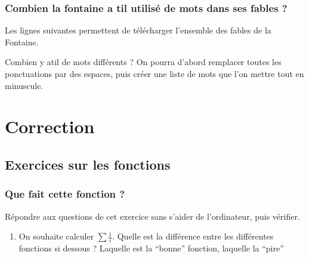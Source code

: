 \documentclass[letterpaper,10pt,english]{sphinxhowto}
\begin{document}
\subsubsection{Combien la fontaine a t\sphinxhyphen{}il utilisé de mots dans ses fables ?}
\label{\detokenize{cours4_chaine_caractere_exercices:combien-la-fontaine-a-t-il-utilise-de-mots-dans-ses-fables}}
\sphinxAtStartPar
Les lignes suivantes permettent de télécharger l’ensemble des fables de la Fontaine.

\sphinxAtStartPar
Combien y a\sphinxhyphen{}t\sphinxhyphen{}il de mots différents ? On pourra d’abord remplacer toutes les ponctuations par des espaces, puis créer une liste de mots que l’on mettre tout en minuscule.


\section{Correction}
\label{\detokenize{correction:correction}}\label{\detokenize{correction::doc}}

\subsection{Exercices sur les fonctions}
\label{\detokenize{cours1_fonctions_corr_exercices:exercices-sur-les-fonctions}}\label{\detokenize{cours1_fonctions_corr_exercices::doc}}

\subsubsection{Que fait cette fonction ?}
\label{\detokenize{cours1_fonctions_corr_exercices:que-fait-cette-fonction}}
\sphinxAtStartPar
Répondre aux questions de cet exercice sans s’aider de l’ordinateur, puis vérifier.
\begin{enumerate}
%
\item {} 
\sphinxAtStartPar
On souhaite calculer \(\sum \frac{1}{i}\). Quelle est la différence entre les différentes fonctions si dessous ? Laquelle est la “bonne” fonction, laquelle la “pire”

\end{enumerate}
\end{document}
